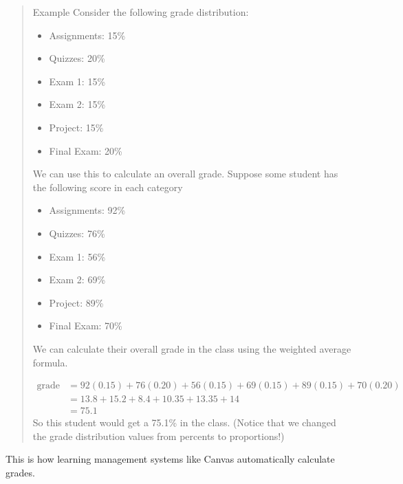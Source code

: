 \documentclass[
]{book}
\providecommand{\tightlist}{%
  \setlength{\itemsep}{0pt}\setlength{\parskip}{0pt}}
\begin{document}
\begin{quote}
Example Consider the following grade distribution:

\begin{itemize}
\tightlist
\item
  Assignments: 15\%
\item
  Quizzes: 20\%
\item
  Exam 1: 15\%
\item
  Exam 2: 15\%
\item
  Project: 15\%
\item
  Final Exam: 20\%
\end{itemize}

We can use this to calculate an overall grade. Suppose some student has the following score in each category

\begin{itemize}
\tightlist
\item
  Assignments: 92\%
\item
  Quizzes: 76\%
\item
  Exam 1: 56\%
\item
  Exam 2: 69\%
\item
  Project: 89\%
\item
  Final Exam: 70\%
\end{itemize}

We can calculate their overall grade in the class using the weighted average formula.

\[\begin{aligned}\text{grade} &= 92(0.15) + 76(0.20) + 56(0.15) + 69(0.15) + 89(0.15) + 70(0.20) \\
&= 13.8 + 15.2 + 8.4 + 10.35 + 13.35 + 14 \\ &= 75.1\end{aligned}\]
So this student would get a 75.1\% in the class. (Notice that we changed the grade distribution values from percents to proportions!)
\end{quote}

This is how learning management systems like Canvas automatically calculate grades.
\end{document}

